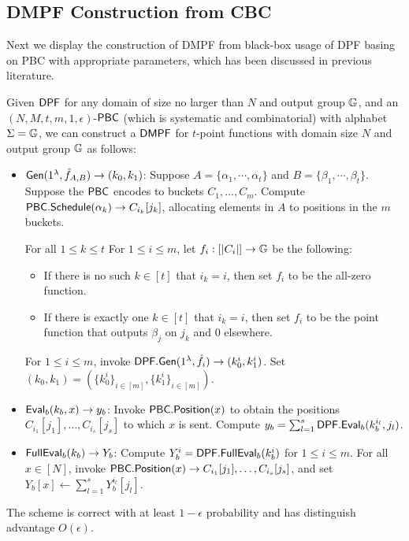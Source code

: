 \subsection{DMPF Construction from CBC}
Next we display the construction of DMPF from black-box usage of DPF basing on PBC with appropriate parameters, which has been discussed in previous literature. 
\begin{construction}\label{con:DMPF_batch_code}
  Given ${\sf DPF}$ for any domain of size no larger than $N$ and output group $\mathbb{G}$, and an $(N,M,t,m,1,\epsilon)$-${\sf PBC}$ (which is systematic and combinatorial) with alphabet $\Sigma=\mathbb{G}$, we can construct a ${\sf DMPF}$ for $t$-point functions with domain size $N$ and output group $\mathbb{G}$ as follows: 
  \begin{itemize}
    \item ${\sf Gen}(1^\lambda, \hat{f}_{A,B})\rightarrow (k_0,k_1)$: Suppose $A=\{\alpha_1,\cdots,\alpha_t\}$ and $B=\{\beta_1,\cdots,\beta_t\}$. Suppose the ${\sf PBC}$ encodes to buckets $C_1,\dots,C_m$. Compute ${\sf PBC}.{\sf Schedule}(\alpha_k)\rightarrow C_{i_k}[j_k]$, allocating elements in $A$ to positions in the $m$ buckets.     
    
    For all $1\le k\le t$ For $1\le i\le m$, let $f_i:[|C_i|]\rightarrow \mathbb{G}$ be the following: 
    \begin{itemize}
      \item If there is no such $k\in[t]$ that $i_k = i$, then set $f_i$ to be the all-zero function. 
      \item If there is exactly one $k\in[t]$ that  $i_k = i$, then set $f_i$ to be the point function that outputs $\beta_j$ on $j_k$ and 0 elsewhere. 
    \end{itemize}
    For $1\le i\le m$, invoke ${\sf DPF}.{\sf Gen}(1^\lambda, \hat{f}_i)\rightarrow (k_0^i,k_1^i)$. Set $(k_0,k_1)=(\{k_0^i\}_{i\in [m]}, \{k_1^i\}_{i\in [m]})$. 
    \item ${\sf Eval}_b(k_b,x)\rightarrow y_b$: Invoke ${\sf PBC}.{\sf Position}(x)$ to obtain the positions $C_{i_1}[j_1],\dots,C_{i_s}[j_s]$ to which $x$ is sent. Compute $y_b=\sum_{l=1}^s{\sf DPF}.{\sf Eval}_b(k_b^{i_l},j_l)$. 
    \item ${\sf FullEval}_b(k_b)\rightarrow Y_b$: Compute $Y_b^i = {\sf DPF}.{\sf FullEval}_b(k_b^i)$ for $1\le i\le m$. For all $x\in [N]$, invoke ${\sf PBC}.{\sf Position}(x)\rightarrow C_{i_1}[j_1],\dots,C_{i_s}[j_s]$, and set $Y_b[x]\gets \sum_{l=1}^sY_b^{i_l}[j_l]$. 
  \end{itemize}
The scheme is correct with at least $1-\epsilon$ probability and has distinguish advantage $O(\epsilon)$. 
\end{construction}

